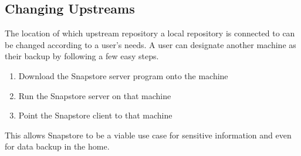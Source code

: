 \subsection{Changing Upstreams}

The location of which upstream repository a local repository is connected to can be changed according to a user's needs. A user can designate another machine as their backup by following a few easy steps. 
\begin{enumerate}
  \item{Download the Snapstore server program onto the machine}
  \item{Run the Snapstore server on that machine}
  \item{Point the Snapstore client to that machine}
\end{enumerate}

This allows Snapstore to be a viable use case for sensitive information and even for data backup in the home.